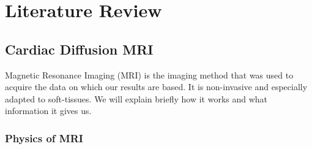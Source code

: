 \chapter{Literature Review}

\section{Cardiac Diffusion MRI}

Magnetic Resonance Imaging (MRI) is the imaging method that was used to acquire the data on which our results are based. It is non-invasive and especially adapted to soft-tissues. \cite{bakermans2008} We will explain briefly how it works and what information it gives us.

\subsection{Physics of MRI}

